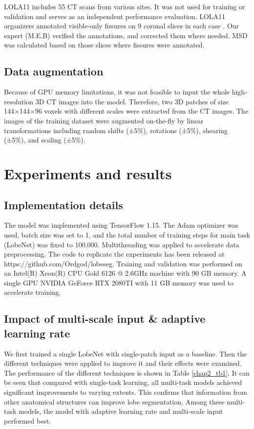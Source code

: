 LOLA11 includes 55 CT scans from various sites. It was not used for training or validation and serves as an independent performance evaluation. LOLA11 organizers annotated visible-only fissures on 9 coronal slices in each case \cite{xiao2016pulmonary}. Our expert (M.E.B) verified the annotations, and corrected them where needed. MSD was calculated based on those slices where fissures were annotated.

\subsection{Data augmentation}
Because of GPU memory limitations, it was not feasible to input the whole high-resolution 3D CT images into the model. Therefore, two 3D patches of size 144×144×96 voxels with different scales were extracted from the CT images. The images of the training dataset were augmented on-the-fly by linear transformations including random shifts (±5\%), rotations (±5\%), shearing (±5\%), and scaling (±5\%). 


\section{Experiments and results}
\subsection{Implementation details}
The model was implemented using TensorFlow 1.15. The Adam optimizer was used, batch size was set to 1, and the total number of training steps for main task (LobeNet) was fixed to 100,000. Multithreading was applied to accelerate data preprocessing. The code to replicate the experiments has been released at https://github.com/Ordgod/lobeseg. Training and validation was performed on an Intel(R) Xeon(R) CPU Gold 6126 @ 2.6GHz machine with 90 GB memory. A single GPU NVIDIA GeForce RTX 2080TI with 11 GB memory was used to accelerate training.

\subsection{Impact of multi-scale input \& adaptive learning rate}
We first trained a single LobeNet with single-patch input as a baseline. Then the different techniques were applied to improve it and their effects were examined. The performance of the different techniques is shown in Table \ref{chap2_tb1}. It can be seen that compared with single-task learning, all multi-task models achieved significant improvements to varying extents. This confirms that information from other anatomical structures can improve lobe segmentation. Among these multi-task models, the model with adaptive learning rate and multi-scale input performed best.



